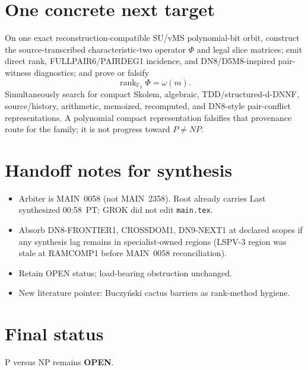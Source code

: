 \documentclass[11pt]{article}
\begin{document}
\section*{One concrete next target}
On one exact reconstruction-compatible SU/vMS polynomial-bit orbit, construct the
source-transcribed characteristic-two operator $\Phi$ and legal slice matrices;
emit direct rank, FULLPAIR6/PAIRDEG1 incidence, and DN8/D5M8-inspired
pair-witness diagnostics; and prove or falsify
\[
\boxed{\operatorname{rank}_{\mathbb F_2}\Phi=\omega(m)}.
\]
Simultaneously search for compact Skolem, algebraic, TDD/structured-d-DNNF,
source/history, arithmetic, memoized, recomputed, and DN8-style pair-conflict
representations. A polynomial compact representation falsifies that provenance
route for the family; it is not progress toward $P\neq NP$.

\section*{Handoff notes for synthesis}
\begin{itemize}
\item Arbiter is MAIN~0058 (not MAIN~2358). Root already carries Last synthesized
00:58~PT; GROK did not edit \texttt{main.tex}.
\item Absorb DN8-FRONTIER1, CROSSDOM1, DN9-NEXT1 at declared scopes if any
synthesis lag remains in specialist-owned regions (LSPV-3 region was stale at
RAMCOMP1 before MAIN~0058 reconciliation).
\item Retain OPEN status; load-bearing obstruction unchanged.
\item New literature pointer: Buczy\'nski cactus barriers as rank-method hygiene.
\end{itemize}

\section*{Final status}
P versus NP remains \textbf{OPEN}.

\end{document}
